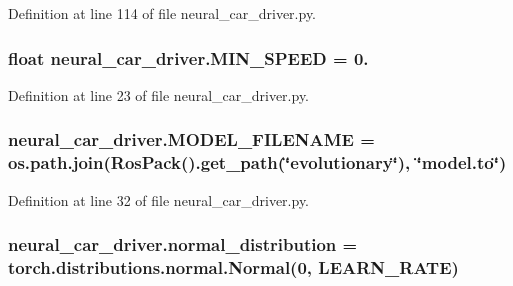 Definition at line 114 of file neural\+\_\+car\+\_\+driver.\+py.

\subsubsection[{\texorpdfstring{M\+I\+N\+\_\+\+S\+P\+E\+ED}{MIN_SPEED}}]{\setlength{\rightskip}{0pt plus 5cm}float neural\+\_\+car\+\_\+driver.\+M\+I\+N\+\_\+\+S\+P\+E\+ED = 0.}\hypertarget{namespaceneural__car__driver_a5292cc13090a4c357e023f5732a8a18a}{}\label{namespaceneural__car__driver_a5292cc13090a4c357e023f5732a8a18a}


Definition at line 23 of file neural\+\_\+car\+\_\+driver.\+py.

\subsubsection[{\texorpdfstring{M\+O\+D\+E\+L\+\_\+\+F\+I\+L\+E\+N\+A\+ME}{MODEL_FILENAME}}]{\setlength{\rightskip}{0pt plus 5cm}neural\+\_\+car\+\_\+driver.\+M\+O\+D\+E\+L\+\_\+\+F\+I\+L\+E\+N\+A\+ME = os.\+path.\+join(Ros\+Pack().get\+\_\+path(\char`\"{}evolutionary\char`\"{}), \char`\"{}model.\+to\char`\"{})}\hypertarget{namespaceneural__car__driver_a067bf25e6557471566d69b477b79ade5}{}\label{namespaceneural__car__driver_a067bf25e6557471566d69b477b79ade5}


Definition at line 32 of file neural\+\_\+car\+\_\+driver.\+py.

\subsubsection[{\texorpdfstring{normal\+\_\+distribution}{normal_distribution}}]{\setlength{\rightskip}{0pt plus 5cm}neural\+\_\+car\+\_\+driver.\+normal\+\_\+distribution = torch.\+distributions.\+normal.\+Normal(0, {\bf L\+E\+A\+R\+N\+\_\+\+R\+A\+TE})}\hypertarget{namespaceneural__car__driver_a953d05d55cd2232a21159009976855f3}{}\label{namespaceneural__car__driver_a953d05d55cd2232a21159009976855f3}


